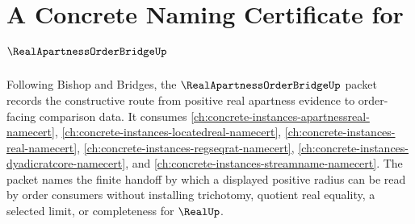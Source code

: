 \chapter{A Concrete Naming Certificate for $\RealApartnessOrderBridgeUp$}
\label{ch:concrete-instances-real-apartness-order-bridge-namecert}

Following Bishop and Bridges, the $\RealApartnessOrderBridgeUp$ packet records the constructive route from positive real apartness evidence to order-facing comparison data. It consumes \autoref{ch:concrete-instances-apartnessreal-namecert}, \autoref{ch:concrete-instances-locatedreal-namecert}, \autoref{ch:concrete-instances-real-namecert}, \autoref{ch:concrete-instances-regseqrat-namecert}, \autoref{ch:concrete-instances-dyadicratcore-namecert}, and \autoref{ch:concrete-instances-streamname-namecert}. The packet names the finite handoff by which a displayed positive radius can be read by order consumers without installing trichotomy, quotient real equality, a selected limit, or completeness for $\RealUp$.

